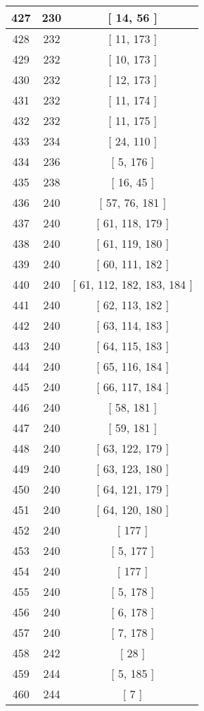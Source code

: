 \begin{center}
\begin{longtable}[H]{|| c c c ||}
\hline
427 & 230 & [ 14, 56 ] \\ 
\hline
428 & 232 & [ 11, 173 ] \\ 
\hline
429 & 232 & [ 10, 173 ] \\ 
\hline
430 & 232 & [ 12, 173 ] \\ 
\hline
431 & 232 & [ 11, 174 ] \\ 
\hline
432 & 232 & [ 11, 175 ] \\ 
\hline
433 & 234 & [ 24, 110 ] \\ 
\hline
434 & 236 & [ 5, 176 ] \\ 
\hline
435 & 238 & [ 16, 45 ] \\ 
\hline
436 & 240 & [ 57, 76, 181 ] \\ 
\hline
437 & 240 & [ 61, 118, 179 ] \\ 
\hline
438 & 240 & [ 61, 119, 180 ] \\ 
\hline
439 & 240 & [ 60, 111, 182 ] \\ 
\hline
440 & 240 & [ 61, 112, 182, 183, 184 ] \\ 
\hline
441 & 240 & [ 62, 113, 182 ] \\ 
\hline
442 & 240 & [ 63, 114, 183 ] \\ 
\hline
443 & 240 & [ 64, 115, 183 ] \\ 
\hline
444 & 240 & [ 65, 116, 184 ] \\ 
\hline
445 & 240 & [ 66, 117, 184 ] \\ 
\hline
446 & 240 & [ 58, 181 ] \\ 
\hline
447 & 240 & [ 59, 181 ] \\ 
\hline
448 & 240 & [ 63, 122, 179 ] \\ 
\hline
449 & 240 & [ 63, 123, 180 ] \\ 
\hline
450 & 240 & [ 64, 121, 179 ] \\ 
\hline
451 & 240 & [ 64, 120, 180 ] \\ 
\hline
452 & 240 & [ 177 ] \\ 
\hline
453 & 240 & [ 5, 177 ] \\ 
\hline
454 & 240 & [ 177 ] \\ 
\hline
455 & 240 & [ 5, 178 ] \\ 
\hline
456 & 240 & [ 6, 178 ] \\ 
\hline
457 & 240 & [ 7, 178 ] \\ 
\hline
458 & 242 & [ 28 ] \\ 
\hline
459 & 244 & [ 5, 185 ] \\ 
\hline
460 & 244 & [ 7 ] \\ 

\end{longtable}
\end{center}
